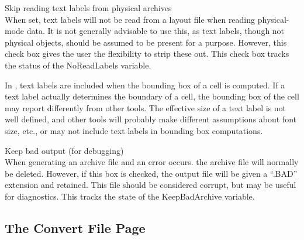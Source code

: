 \begin{description}
\item{\cb Skip reading text labels from physical archives}\\
When set, text labels will not be read from a layout file when reading
physical-mode data.  It is not generally advisable to use this, as
text labels, though not physical objects, should be assumed to be
present for a purpose.  However, this check box gives the user the
flexibility to strip these out.  This check box tracks the status of
the {\et NoReadLabels} variable.

In {\Xic}, text labels are included when the bounding box of a cell is
computed.  If a text label actually determines the boundary of a cell,
the bounding box of the cell may report differently from other tools. 
The effective size of a text label is not well defined, and other
tools will probably make different assumptions about font size, etc.,
or may not include text labels in bounding box computations.

\item{\cb Keep bad output (for debugging)}\\
When generating an archive file and an error occurs.  the archive file
will normally be deleted.  However, if this box is checked, the output
file will be given a ``{\vt .BAD}'' extension and retained.  This file
should be considered corrupt, but may be useful for diagnostics.  This
tracks the state of the {\et KeepBadArchive} variable.
\end{description}

\subsection{The Convert File Page}

